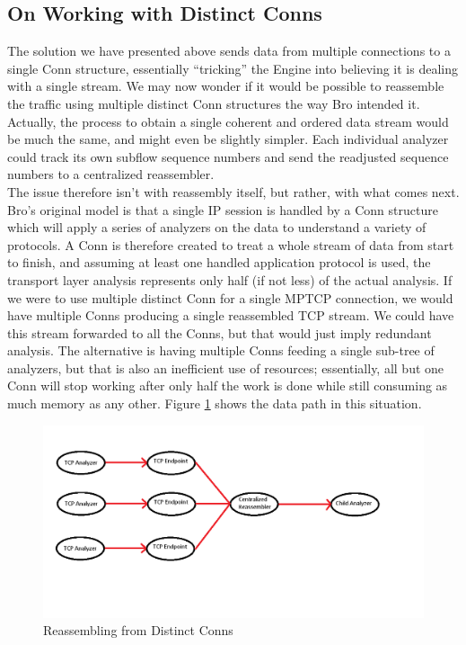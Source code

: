 \subsection{On Working with Distinct Conns}

The solution we have presented above sends data from multiple connections to a single Conn structure, essentially ``tricking'' the Engine into believing it is dealing with a single stream. We may now wonder if it would be possible to reassemble the traffic using multiple distinct Conn structures the way Bro intended it. Actually, the process to obtain a single coherent and ordered data stream would be much the same, and might even be slightly simpler. Each individual analyzer could track its own subflow sequence numbers and send the readjusted sequence numbers to a centralized reassembler.\\

The issue therefore isn't with reassembly itself, but rather, with what comes next. Bro's original model is that a single IP session is handled by a Conn structure which will apply a series of analyzers on the data to understand a variety of protocols. A Conn is therefore created to treat a whole stream of data from start to finish, and assuming at least one handled application protocol is used, the transport layer analysis represents only half (if not less) of the actual analysis. If we were to use multiple distinct Conn for a single MPTCP connection, we would have multiple Conns producing a single reassembled TCP stream. We could have this stream forwarded to all the Conns, but that would just imply redundant analysis. The alternative is having multiple Conns feeding a single sub-tree of analyzers, but that is also an inefficient use of resources; essentially, all but one Conn will stop working after only half the work is done while still consuming as much memory as any other. Figure \ref{pic:reassemblymany} shows the data path in this situation.


\begin{figure}[!t]
\centering
\includegraphics[width=\columnwidth]{Figures/manytoone.png}
\caption{Reassembling from Distinct Conns}
\label{pic:reassemblymany}
\end{figure}



